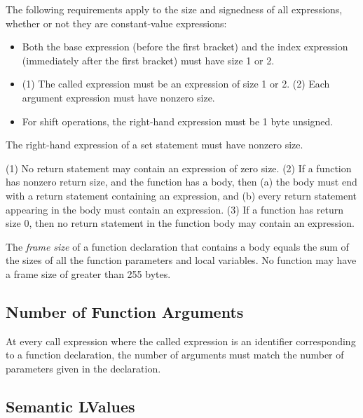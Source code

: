 \documentclass[10pt]{article}
\begin{document}
 The
following requirements apply to the size and signedness of all
   expressions, whether or not they are constant-value expressions:
%
\begin{itemize}
%
\item {} Both the base expression (before
  the first bracket) and the index expression (immediately after the
  first bracket) must have size 1 or 2.
%
\item {} (1) The called expression must be an
  expression of size 1 or 2.  (2) Each argument expression must have
  nonzero size.
%
\item {}  For shift operations,
  the right-hand expression must be 1 byte unsigned.
%
\end{itemize}

 The right-hand expression of a set statement
must have nonzero size.

 (1) No return statement may contain an
expression of zero size.  (2) If a function has nonzero return size,
and the function has a body, then (a) the body must end with a return
statement containing an expression, and (b) every return statement
appearing in the body must contain an expression.  (3) If a function
has return size 0, then no return statement in the function body may
contain an expression.

 The \emph{frame size} of a function
declaration that contains a body equals the sum of the sizes of all
the function parameters and local variables.  No function may have a
frame size of greater than 255 bytes.



\subsection{Number of Function Arguments}
\label{sec:semantics:fn-args}

At every call expression where the called expression is an identifier
corresponding to a function declaration, the number of arguments must
match the number of parameters given in the declaration.

\subsection{Semantic LValues}
\label{sec:semantics:lvalues}
\end{document}
